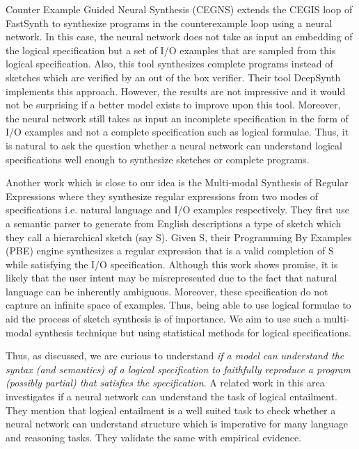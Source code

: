 Counter Example Guided Neural Synthesis (CEGNS) \cite{polgreen2020counterexample} extends the CEGIS loop of FastSynth to synthesize programs in the counterexample loop using a neural network. In this case, the neural network does not take as input an embedding of the logical specification but a set of I/O examples that are sampled from this logical specification. Also, this tool synthesizes complete programs instead of sketches which are verified by an out of the box verifier. Their tool DeepSynth implements this approach.  However, the results are not impressive and it would not be surprising if a better model exists to improve upon this tool.  Moreover, the neural network still takes as input an incomplete specification in the form of I/O examples and not a complete specification such as logical formulae. Thus, it is natural to ask the question whether a neural network can understand  logical specifications well enough to synthesize sketches or complete programs.

Another work which is close to our idea is the Multi-modal Synthesis of Regular Expressions \cite{chen2019multi} where they synthesize regular expressions from two modes of specifications i.e. natural language and I/O examples respectively. They first use a semantic parser to generate from English descriptions a type of sketch which they call a hierarchical sketch (say S). Given S, their Programming By Examples (PBE) engine synthesizes a regular expression that is a valid completion of S while satisfying the I/O specification. Although this work shows promise, it is likely that the user intent may be misrepresented due to the fact that natural language can be inherently ambiguous. Moreover, these specification do not capture an infinite space of examples. Thus, being able to use logical formulae to aid the process of sketch synthesis is of importance. We aim to use such a multi-modal synthesis technique but using statistical methods for logical specifications.

Thus,  as discussed,  we are curious to understand \emph{if a model can understand the syntax (and semantics) of a logical specification to faithfully reproduce a program (possibly partial) that satisfies the specification}.  A related work \cite{evans2018neural} in this area investigates if a neural network can understand the task of logical entailment. They mention that logical entailment is a well suited task to check whether a neural network can understand structure which is imperative for many language and reasoning tasks.  They validate the same with empirical evidence.

